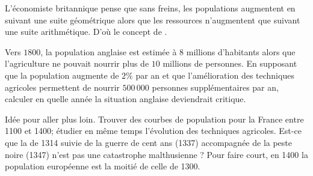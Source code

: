 
\begin{exercice}\label{exosmath-0375}

    L'économiste britannique  pense que sans freins, les populations augmentent en suivant une suite géométrique alors que les ressources n'augmentent que suivant une suite arithmétique. D'où le concept de .

    Vers \( 1800\), la population anglaise est estimée à \( 8\) millions d'habitants alors que l'agriculture ne pouvait nourrir plus de \( 10\) millions de personnes. En supposant que la population augmente de \( 2\%\) par an et que l'amélioration des techniques agricoles permettent de nourrir \( 500\,000\) personnes supplémentaires par an, calculer en quelle année la situation anglaise deviendrait critique.

    \vspace{1cm}

    Idée pour aller plus loin. Trouver des courbes de population pour la France entre 1100 et 1400; étudier en même temps l'évolution des techniques agricoles. Est-ce que la  de 1314 suivie de la guerre de cent ans (1337) accompagnée de la peste noire (1347) n'est pas une catastrophe malthusienne ? Pour faire court, en 1400 la population européenne est la moitié de celle de 1300.
\end{exercice}
